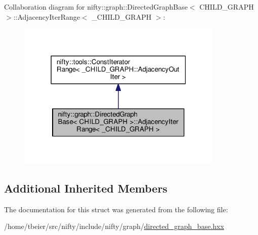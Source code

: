 Collaboration diagram for nifty\+:\+:graph\+:\+:Directed\+Graph\+Base$<$ C\+H\+I\+L\+D\+\_\+\+G\+R\+A\+P\+H $>$\+:\+:Adjacency\+Iter\+Range$<$ \+\_\+\+C\+H\+I\+L\+D\+\_\+\+G\+R\+A\+P\+H $>$\+:\nopagebreak
\begin{figure}[H]
\begin{center}
\leavevmode
\includegraphics[width=279pt]{structnifty_1_1graph_1_1DirectedGraphBase_1_1AdjacencyIterRange__coll__graph}
\end{center}
\end{figure}
\subsection*{Additional Inherited Members}


The documentation for this struct was generated from the following file\+:\begin{DoxyCompactItemize}
\item 
/home/tbeier/src/nifty/include/nifty/graph/\hyperlink{directed__graph__base_8hxx}{directed\+\_\+graph\+\_\+base.\+hxx}\end{DoxyCompactItemize}
